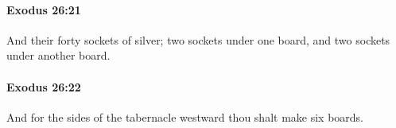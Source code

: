 		\paragraph{Exodus 26:21} %
			\label{EXODUS-26-21}

			And their forty sockets of silver; two sockets under one board, and two sockets under another board.


		\paragraph{Exodus 26:22} %
			\label{EXODUS-26-22}

			And for the sides of the tabernacle westward thou shalt make six boards.


